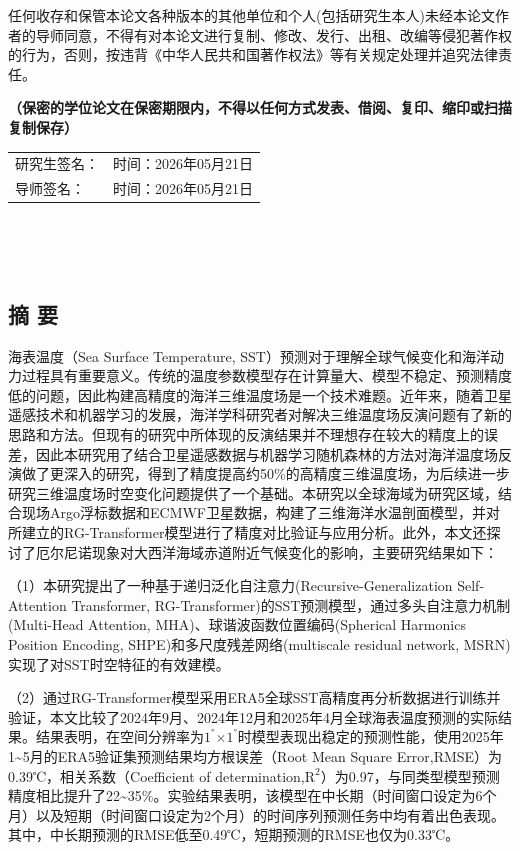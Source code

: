 \documentclass[
  12pt,
]{article}
\newcounter{none} %
\begin{document}
任何收存和保管本论文各种版本的其他单位和个人(包括研究生本人)未经本论文作者的导师同意，不得有对本论文进行复制、修改、发行、出租、改编等侵犯著作权的行为，否则，按违背《中华人民共和国著作权法》等有关规定处理并追究法律责任。

\textbf{（保密的学位论文在保密期限内，不得以任何方式发表、借阅、复印、缩印或扫描复制保存）}

{\def\LTcaptype{none} %
\begin{longtable}[]{@{}
  >{\raggedright\arraybackslash}p{}
  >{\raggedright\arraybackslash}p{}@{}}
\toprule\noalign{}
\endhead
\bottomrule\noalign{}
\endlastfoot
研究生签名： & 时间：2026年05月21日 \\
导师签名： & 时间：2026年05月21日 \\
\end{longtable}
}

　　　　　　

　　　　　　

\subsection{摘 要}\label{ux6458-ux8981}

海表温度（Sea Surface Temperature,
SST）预测对于理解全球气候变化和海洋动力过程具有重要意义。传统的温度参数模型存在计算量大、模型不稳定、预测精度低的问题，因此构建高精度的海洋三维温度场是一个技术难题。近年来，随着卫星遥感技术和机器学习的发展，海洋学科研究者对解决三维温度场反演问题有了新的思路和方法。但现有的研究中所体现的反演结果并不理想存在较大的精度上的误差，因此本研究用了结合卫星遥感数据与机器学习随机森林的方法对海洋温度场反演做了更深入的研究，得到了精度提高约50\%的高精度三维温度场，为后续进一步研究三维温度场时空变化问题提供了一个基础。本研究以全球海域为研究区域，结合现场Argo浮标数据和ECMWF卫星数据，构建了三维海洋水温剖面模型，并对所建立的RG-Transformer模型进行了精度对比验证与应用分析。此外，本文还探讨了厄尔尼诺现象对大西洋海域赤道附近气候变化的影响，主要研究结果如下：

（1）本研究提出了一种基于递归泛化自注意力(Recursive-Generalization
Self-Attention Transformer,
RG-Transformer)的SST预测模型，通过多头自注意力机制(Multi-Head Attention,
MHA)、球谐波函数位置编码(Spherical Harmonics Position Encoding,
SHPE)和多尺度残差网络(multiscale residual network,
MSRN)实现了对SST时空特征的有效建模。

（2）通过RG-Transformer模型采用ERA5全球SST高精度再分析数据进行训练并验证，本文比较了2024年9月、2024年12月和2025年4月全球海表温度预测的实际结果。结果表明，在空间分辨率为\(\text{1}^{\text{°}}\text{×}\text{1}^{\text{°}}\)时模型表现出稳定的预测性能，使用2025年1\textasciitilde5月的ERA5验证集预测结果均方根误差（Root
Mean Square Error,RMSE）为0.39℃，相关系数（Coefficient of
determination,\(\text{R}^{\text{2}}\)）为0.97，与同类型模型预测精度相比提升了22\textasciitilde35\%。实验结果表明，该模型在中长期（时间窗口设定为6个月）以及短期（时间窗口设定为2个月）的时间序列预测任务中均有着出色表现。其中，中长期预测的RMSE低至0.49℃，短期预测的RMSE也仅为0.33℃。
\end{document}
